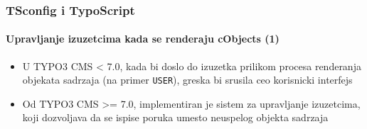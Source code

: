 
\begin{frame}[fragile]
	\frametitle{TSconfig i TypoScript}
	\framesubtitle{Upravljanje izuzetcima kada se renderaju cObjects (1)}

	\begin{itemize}
		\item U TYPO3 CMS < 7.0, kada bi doslo do izuzetka prilikom procesa renderanja objekata sadrzaja (na primer \texttt{USER}), greska bi srusila ceo korisnicki interfejs
		\item Od TYPO3 CMS >= 7.0, implementiran je sistem za upravljanje izuzetcima, koji dozvoljava da se ispise poruka umesto neuspelog objekta sadrzaja
	\end{itemize}

%

\end{frame}


